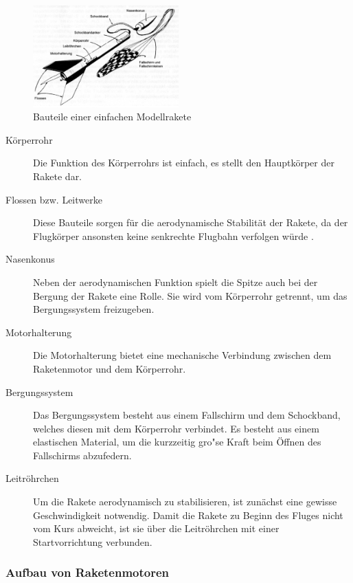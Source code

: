 \documentclass[10pt,a4paper]{article}
\begin{document}
\begin{figure}[h]
	\centering
	\includegraphics[width=0.5\textwidth]{Bilder/Bauteile-einer-Modellrakete.png}
	\caption{Bauteile einer einfachen Modellrakete \cite{om}}
\end{figure}

\begin{description}
	\item[Körperrohr] Die Funktion des Körperrohrs ist einfach, es stellt den Hauptkörper der Rakete dar.
	
	\item[Flossen bzw. Leitwerke] Diese Bauteile sorgen für die aerodynamische Stabilität der Rakete, da der Flugkörper ansonsten keine senkrechte Flugbahn verfolgen würde \cite{om}.
	
	\item[Nasenkonus] Neben der aerodynamischen Funktion spielt die Spitze auch bei der Bergung der Rakete eine Rolle. Sie wird vom Körperrohr getrennt, um das Bergungssystem freizugeben.
	
	\item[Motorhalterung] Die Motorhalterung bietet eine mechanische Verbindung zwischen dem Raketenmotor und dem Körperrohr.
	
	\item[Bergungssystem] Das Bergungssystem besteht aus einem Fallschirm und dem Schockband, welches diesen mit dem Körperrohr verbindet. Es besteht aus einem elastischen Material, um die kurzzeitig gro"se Kraft beim Öffnen des Fallschirms abzufedern.
	
	\item[Leitröhrchen] Um die Rakete aerodynamisch zu stabilisieren, ist zunächst eine gewisse Geschwindigkeit notwendig. Damit die Rakete zu Beginn des Fluges nicht vom Kurs abweicht, ist sie über die Leitröhrchen mit einer Startvorrichtung verbunden.
\end{description}


\subsubsection{Aufbau von Raketenmotoren}
\label{sssec-Aufbau-von-Raketenmotoren}
 
\end{document}
